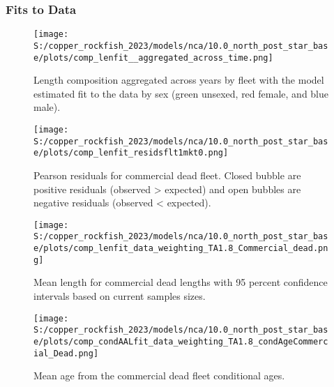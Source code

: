 \documentclass[11pt,
  letterpaper,
]{article}
\begin{document}
\pagebreak

\subsubsection{Fits to Data}\label{fits-to-data}

\begin{figure}
{\centering
\texttt{[image: S:/copper\_rockfish\_2023/models/nca/10.0\_north\_post\_star\_base/plots/comp\_lenfit\_\_aggregated\_across\_time.png]}
}
\caption{Length composition aggregated across years by fleet with the model estimated fit to the data by sex (green unsexed, red female, and blue male).\label{fig:len-agg-fit}}
\end{figure}

\pagebreak

\begin{figure}
{\centering
\texttt{[image: S:/copper\_rockfish\_2023/models/nca/10.0\_north\_post\_star\_base/plots/comp\_lenfit\_residsflt1mkt0.png]}
}
\caption{Pearson residuals for commercial dead fleet. Closed bubble are positive residuals (observed > expected) and open bubbles are negative residuals (observed < expected).\label{fig:com-dead-pearson}}
\end{figure}

\pagebreak

\begin{figure}
{\centering
\texttt{[image: S:/copper\_rockfish\_2023/models/nca/10.0\_north\_post\_star\_base/plots/comp\_lenfit\_data\_weighting\_TA1.8\_Commercial\_dead.png]}
}
\caption{Mean length for commercial dead lengths with 95 percent confidence intervals based on current samples sizes.\label{fig:com-dead-mean-len-fit}}
\end{figure}

\pagebreak

\begin{figure}
{\centering
\texttt{[image: S:/copper\_rockfish\_2023/models/nca/10.0\_north\_post\_star\_base/plots/comp\_condAALfit\_data\_weighting\_TA1.8\_condAgeCommercial\_Dead.png]}
}
\caption{Mean age from the commercial dead fleet conditional ages.\label{fig:com-dead-mean-age}}
\end{figure}
\end{document}

